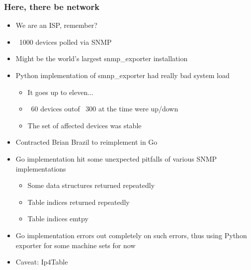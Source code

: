 \documentclass[t]{beamer}
\begin{document}
\begin{frame}
	\frametitle{Here, there be network}
	\begin{itemize}
		\item We are an ISP, remember?
		\item ~1000 devices polled via SNMP
		\item Might be the world's largest snmp\_exporter installation
		\item Python implementation of smnp\_exporter had really bad system load
		\begin{itemize}
			\item It goes up to eleven...
			\item ~60 devices outof ~300 at the time were up/down
			\item The set of affected devices was stable
		\end{itemize}
		\item Contracted Brian Brazil to reimplement in Go
		\item Go implementation hit some unexpected pitfalls of various SNMP implementations
		\begin{itemize}
			\item Some data structures returned repeatedly
			\item Table indices returned repeatedly
			\item Table indices emtpy
		\end{itemize}
		\item Go implementation errors out completely on such errors, thus using Python exporter for some machine sets for now
		\item Caveat: Ip4Table %
	\end{itemize}
\end{frame}




\end{document}
